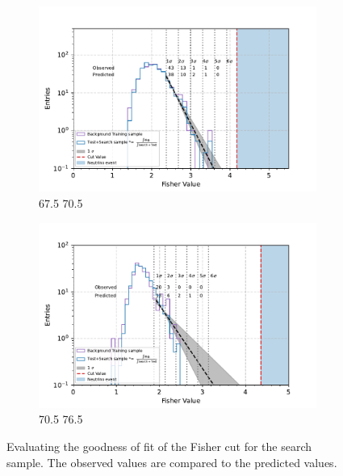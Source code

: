 \begin{figure}[h!]
    \begin{subfigure}[r]{.48\textwidth}
      \centering
      \includegraphics[width=\linewidth]{thesis_figures/Nu_analysis/Fisher_plots/Fisher_fit_search+test_bkg_region_67.5_70.5.pdf}
      \caption{67.5 70.5}
    \end{subfigure}
    \hfill    
    \begin{subfigure}[r]{.48\textwidth}
      \centering
      \includegraphics[width=\linewidth]{thesis_figures/Nu_analysis/Fisher_plots/Fisher_fit_search+test_bkg_region_70.5_73.5.pdf}
      \caption{70.5 76.5}
   \end{subfigure}
   \caption{Evaluating the goodness of fit of the Fisher cut for the search sample. The observed values are compared to the predicted values.}
    \label{fig:Fisher_cut_2}

\end{figure}

